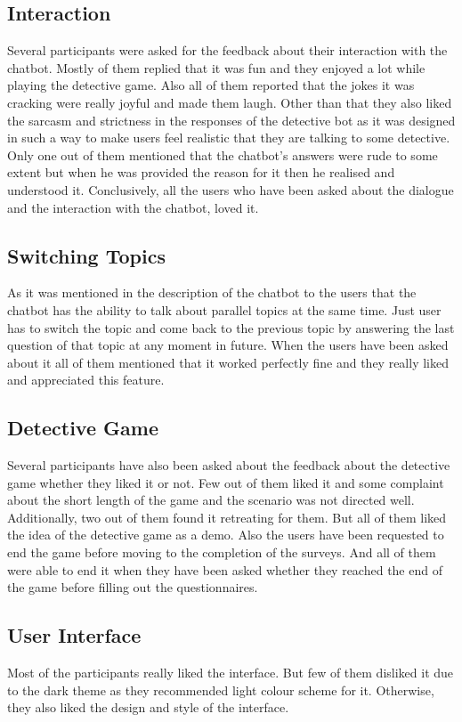 \subsection{Interaction}
Several participants were asked for the feedback about their interaction with the chatbot. Mostly of them replied that it was fun and they enjoyed a lot while playing the detective game. Also all of them reported that the jokes it was cracking were really joyful and made them laugh. Other than that they also liked the sarcasm and strictness in the responses of the detective bot as it was designed in such a way to make users feel realistic that they are talking to some detective. Only one out of them mentioned that the chatbot's answers were rude to some extent but when he was provided the reason for it then he realised and understood it. Conclusively, all the users who have been asked about the dialogue and the interaction with the chatbot, loved it.

\subsection{Switching Topics}
As it was mentioned in the description of the chatbot to the users that the chatbot has the ability to talk about parallel topics at the same time. Just user has to switch the topic and come back to the previous topic by answering the last question of that topic at any moment in future. When the users have been asked about it all of them mentioned that it worked perfectly fine and they really liked and appreciated this feature.

\subsection{Detective Game}
Several participants have also been asked about the feedback about the detective game whether they liked it or not. Few out of them liked it and some complaint about the short length of the game and the scenario was not directed well. Additionally, two out of them found it retreating for them. But all of them liked the idea of the detective game as a demo. Also the users have been requested to end the game before moving to the completion of the surveys. And all of them were able to end it when they have been asked whether they reached the end of the game before filling out the questionnaires.

\subsection{User Interface}
Most of the participants really liked the interface. But few of them disliked it due to the dark theme as they recommended light colour scheme for it. Otherwise, they also liked the design and style of the interface.  


